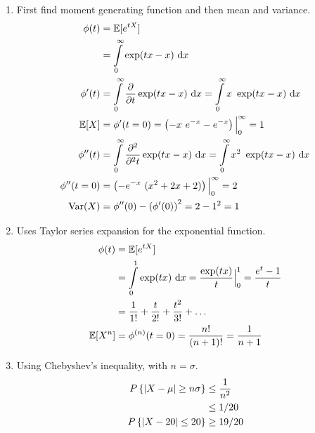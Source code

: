 \begin{enumerate}
	\item First find moment generating function and then mean and variance.\\
	\begin{subequations}
		\begin{align}
			\phi (t) &= \mathbb{E}[e^{tX}] \nonumber \\
			&= \int\limits_{0}^{\infty} \exp(tx - x)\ \mathrm{d} x \nonumber \\
			\phi'(t) &=  \int\limits_{0}^{\infty} \frac{\partial}{\partial t} \exp(tx - x)\ \mathrm{d} x = \int\limits_{0}^{\infty} x\ \exp(tx - x)\ \mathrm{d} x \nonumber \\
			\mathbb{E}[X] &= \phi'(t = 0) = \left(-x\ e^{-x} - e^{-x} \right)\Big|_0^{\infty}   = 1\\
			\phi''(t) &=  \int\limits_{0}^{\infty} \frac{\partial^2}{\partial^2 t} \exp(tx - x)\ \mathrm{d} x = \int\limits_{0}^{\infty} x^2\ \exp(tx - x)\ \mathrm{d} x \nonumber \\
			\phi''(t = 0) &= \left(-e^{-x}\ (x^2 + 2x + 2) \right)\Big|_0^{\infty} = 2  \\
			\mathrm{Var}(X) &= \phi''(0) - \left(\phi'(0)\right)^2 = 2 - 1^2 = 1
		\end{align} \\
	\end{subequations}
	
	\item Uses Taylor series expansion for the exponential function.\\
	\begin{subequations}
		\begin{align}
			\phi (t) &= \mathbb{E}[e^{tX}] \nonumber \\
			&= \int\limits_{0}^{1} \exp(tx)\ \mathrm{d} x = \frac{\exp(tx)}{t} \Big|_0^1 = \frac{e^t - 1}{t}\nonumber \\
			&= \frac{1}{1!} + \frac{t}{2!} + \frac{t^2}{3!} + \dots \\
			\mathbb{E}[X^n] &= \phi^{(n)} (t = 0) = \frac{n!}{(n+1)!} = \frac{1}{n+1} \\
		\end{align} \\
	\end{subequations}
	
	\item Using Chebyshev's inequality, with $ n = \sigma $.\\
	\begin{subequations}
		\begin{align}
			P\left\{\left| X - \mu \right| \geq n\sigma \right\} &\leq \frac{1}{n^2} \nonumber \\
			& \leq 1/20 \nonumber \\
			P\left\{\left| X - 20 \right| \leq 20 \right\} &\geq 19/20
		\end{align} \\
	\end{subequations}
	

\end{enumerate}
